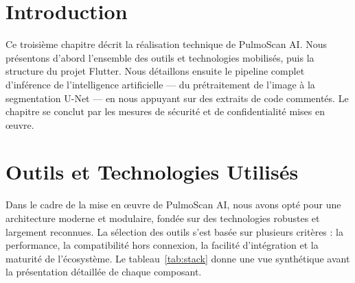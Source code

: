 \documentclass[12pt,a4paper]{report}
\begin{document}
\section*{Introduction}
Ce troisième chapitre décrit la réalisation technique de PulmoScan AI. Nous présentons d'abord l'ensemble des outils et technologies mobilisés, puis la structure du projet Flutter. Nous détaillons ensuite le pipeline complet d'inférence de l'intelligence artificielle --- du prétraitement de l'image à la segmentation U-Net --- en nous appuyant sur des extraits de code commentés. Le chapitre se conclut par les mesures de sécurité et de confidentialité mises en œuvre.

\section{Outils et Technologies Utilisés}

Dans le cadre de la mise en œuvre de PulmoScan AI, nous avons opté pour une architecture moderne et modulaire, fondée sur des technologies robustes et largement reconnues. La sélection des outils s'est basée sur plusieurs critères : la performance, la compatibilité hors connexion, la facilité d'intégration et la maturité de l'écosystème. Le tableau~\ref{tab:stack} donne une vue synthétique avant la présentation détaillée de chaque composant.
\end{document}
